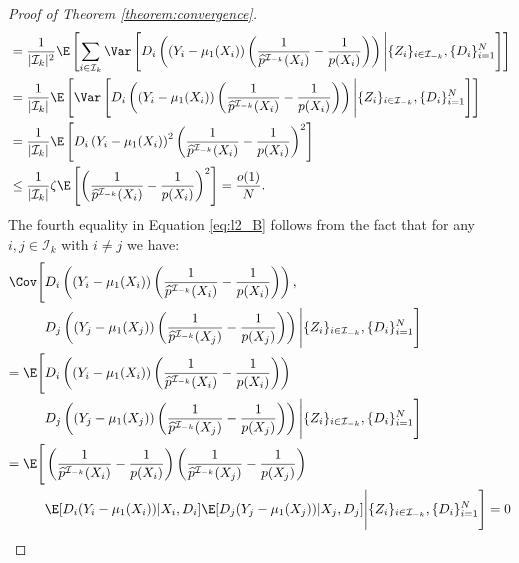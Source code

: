 \begin{appendix}
\begin{proof}[Proof of Theorem \ref{theorem:convergence}]
\begin{align}
\begin{split}
            &= \frac{1}{\vert \mathcal{I}_k \vert^2} \E\left[  \sum_{i\in\mathcal{I}_k} \Var\left[ D_i \left(\left(Y_i - \mu_1(X_i)\right) \left( \frac{1}{\widehat{p}^{\mathcal{I}_{-k}}(X_i)} - \frac{1}{p(X_i)}\right) \right)  \Bigg\vert \{Z_i\}_{i\in \mathcal{I}_{-k}},  \{D_i\}_{i=1}^N \right]\right]\\
            &= \frac{1}{\vert \mathcal{I}_k \vert} \E\left[ \Var\left[ D_i \left(\left(Y_i - \mu_1(X_i)\right) \left( \frac{1}{\widehat{p}^{\mathcal{I}_{-k}}(X_i)} - \frac{1}{p(X_i)}\right) \right)  \Bigg\vert \{Z_i\}_{i\in \mathcal{I}_{-k}},  \{D_i\}_{i=1}^N \right]\right]\\
            &= \frac{1}{\vert \mathcal{I}_k \vert} \E\left[ D_i \left(Y_i - \mu_1(X_i)\right)^2 \left( \frac{1}{\widehat{p}^{\mathcal{I}_{-k}}(X_i)} - \frac{1}{p(X_i)}\right)^2 \right]\\
            &\leq \frac{1}{\vert \mathcal{I}_k \vert} \zeta \E\left[\left( \frac{1}{\widehat{p}^{\mathcal{I}_{-k}}(X_i)} - \frac{1}{p(X_i)}\right)^2 \right] = \frac{o(1)}{N}.
        \end{split}
    \end{align}
    The fourth equality in Equation \eqref{eq:l2_B} follows from the fact that for any $i,j\in \mathcal{I}_k$ with $i\neq j$ we have:
    \begin{align*}
        \Cov\Bigg[& D_i \left(\left(Y_i - \mu_1(X_i)\right) \left( \frac{1}{\widehat{p}^{\mathcal{I}_{-k}}(X_i)} - \frac{1}{p(X_i)}\right) \right),\\ 
        & D_j \left(\left(Y_j - \mu_1(X_j)\right) \left( \frac{1}{\widehat{p}^{\mathcal{I}_{-k}}(X_j)} - \frac{1}{p(X_j)}\right) \right) \Bigg\vert \{Z_i\}_{i\in \mathcal{I}_{-k}},  \{D_i\}_{i=1}^N \Bigg]\\
        = \E\Bigg[& D_i \left(\left(Y_i - \mu_1(X_i)\right) \left( \frac{1}{\widehat{p}^{\mathcal{I}_{-k}}(X_i)} - \frac{1}{p(X_i)}\right) \right)\\ 
        & D_j \left(\left(Y_j - \mu_1(X_j)\right) \left( \frac{1}{\widehat{p}^{\mathcal{I}_{-k}}(X_j)} - \frac{1}{p(X_j)}\right) \right) \Bigg\vert \{Z_i\}_{i\in \mathcal{I}_{-k}},  \{D_i\}_{i=1}^N \Bigg]\\
        = \E\Bigg[& \left( \frac{1}{\widehat{p}^{\mathcal{I}_{-k}}(X_i)} - \frac{1}{p(X_i)}\right) \left( \frac{1}{\widehat{p}^{\mathcal{I}_{-k}}(X_j)} - \frac{1}{p(X_j)}\right) \\ 
        & \E[D_i(Y_i - \mu_1(X_i)) \vert X_i, D_i ] \E[D_j(Y_j - \mu_1(X_j)) \vert X_j, D_j ] \Bigg\vert \{Z_i\}_{i\in \mathcal{I}_{-k}},  \{D_i\}_{i=1}^N \Bigg] = 0

\end{align*}
\end{proof}
\end{appendix}
